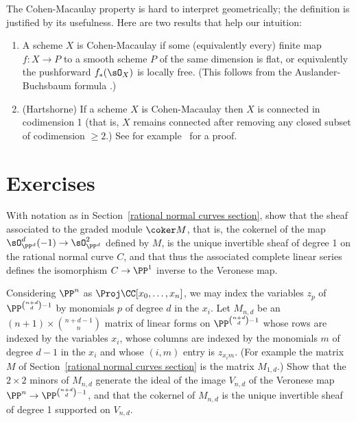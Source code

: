 \begin{fact}\label{meaning of ACM}
The Cohen-Macaulay property is hard to interpret geometrically; the definition is justified by its usefulness. Here are two results that help our intuition:
\begin{enumerate}
\item A scheme $X$ is Cohen-Macaulay if some (equivalently every) finite map $f: X\to P$ to a smooth scheme $P$
of the same dimension is flat, or equivalently the pushforward $f_*(\sO_X)$ is locally free. (This follows
from the Auslander-Buchsbaum formula \cite[Section 19.3]{Eisenbud1995}.)
\item (Hartshorne) If a scheme $X$ is Cohen-Macaulay then $X$ is connected in codimension 1 (that is, $X$ remains connected after removing any closed subset of codimension $\geq 2$.)
See for example~\cite[Theorem 18.12]{Eisenbud1995} for a proof.
\end{enumerate}
 
\end{fact}


\section{Exercises}

\begin{exercise}\label{veronese inverse}
With notation as in Section~\ref{rational normal curves section}, show that the sheaf associated to the graded module $\coker M$,
that is, the cokernel of the map $\sO_{\PP^d}^d(-1) \to \sO_{\PP^d}^2$ defined by $M$, is the unique invertible sheaf of degree 1
on the rational normal curve $C$, and that thus the associated complete linear series defines the isomorphism $C\to \PP^1$ inverse
to the Veronese map.
\end{exercise}

\begin{exercise}\label{equations of Veroneses}
Considering $\PP^n$ as $\Proj \CC[x_0,\dots,x_n]$, we may index the variables $z_p$ of $\PP^{\binom{n+d}{d}-1}$ by  monomials $p$
of degree $d$ in the $x_i$. Let $M_{n,d}$ be an $(n+1)\times \binom{n+d-1}{n}$ matrix of linear forms
on $\PP^{\binom{n+d}{d}-1}$ whose rows are indexed by the variables $x_i$, whose columns are indexed by the monomials $m$ of degree $d-1$ in the $x_i$ and
whose $(i,m)$ entry is $z_{x_im}$. (For example the matrix
$M$ of Section~\ref{rational normal curves section} is the matrix $M_{1,d}$.) Show that the $2\times 2$ minors of $M_{n,d}$ generate the ideal of the image $V_{n,d}$ of the Veronese map 
$\PP^n\to \PP^{\binom{n+d}{d}-1}$, and that the cokernel of $M_{n,d}$ is the unique invertible sheaf of degree 1 supported on $V_{n,d}$.
\end{exercise}

